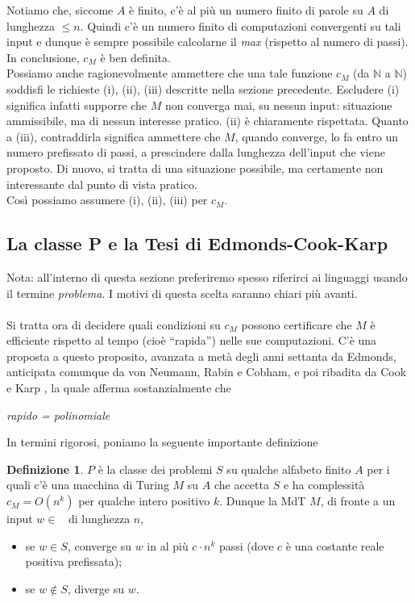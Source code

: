 \documentclass[12pt,a4paper]{report}
\theoremstyle{definition}
\newtheorem{defn}[teo]{Definizione}  %
\DeclareMathOperator{\aaa}{\textit{A}^{\star}}
\begin{document}
Notiamo che, siccome $A$ è finito, c'è al più un numero finito di parole su $A$ di lunghezza $\leq n$. Quindi c'è un numero finito di computazioni convergenti su tali input e dunque è sempre possibile calcolarne il \emph{max} (rispetto al numero di passi). In conclusione, $c_M$ è ben definita.\\
Possiamo anche ragionevolmente ammettere che una tale funzione $c_M$ (da $\mathbb{N}$ a $\mathbb{N}$) soddisfi le richieste (i), (ii), (iii) descritte nella sezione precedente. Escludere (i) significa infatti supporre che $M$ non converga mai, su nessun input: situazione ammissibile, ma di nessun interesse pratico. (ii) è chiaramente rispettata. Quanto a (iii), contraddirla significa ammettere che $M$, quando converge, lo fa entro un numero prefissato di passi, a prescindere dalla lunghezza dell'input che viene proposto. Di nuovo, si tratta di una situazione possibile, ma certamente non interessante dal punto di vista pratico.\\
Così possiamo assumere (i), (ii), (iii) per $c_M$.


\subsection{La classe P e la Tesi di Edmonds-Cook-Karp}

Nota: all'interno di questa sezione preferiremo spesso riferirci ai linguaggi usando il termine \emph{problema}. I motivi di questa scelta saranno chiari più avanti.\\
\\
Si tratta ora di decidere quali condizioni su $c_M$ possono certificare che $M$ è efficiente rispetto al tempo (cioè ``rapida'') nelle sue computazioni. C'è una proposta a questo proposito, avanzata a metà degli anni settanta da Edmonds, anticipata comunque da von Neumann, Rabin e Cobham, e poi ribadita da Cook e Karp \cite[pag. 134]{Toffalori:tesi}, la quale afferma sostanzialmente che\\
\centerline{\emph{rapido = polinomiale}}
In termini rigorosi, poniamo la seguente importante definizione

\begin{defn}
$P$ è la classe dei problemi $S$ su qualche alfabeto finito $A$ per i quali c'è una macchina di Turing $M$ su $A$ che accetta $S$ e ha complessità $c_M = O(n^k)$ per qualche intero positivo $k$. Dunque la MdT $M$, di fronte a un input $w \in \aaa$ di lunghezza $n$,
\begin{itemize}
\item se $w \in S$, converge su $w$ in al più $c \cdot n^k$ passi (dove $c$ è una costante reale positiva prefissata);
\item se $w \not\in S$, diverge su $w$.
\end{itemize}
\end{defn}
\end{document}
